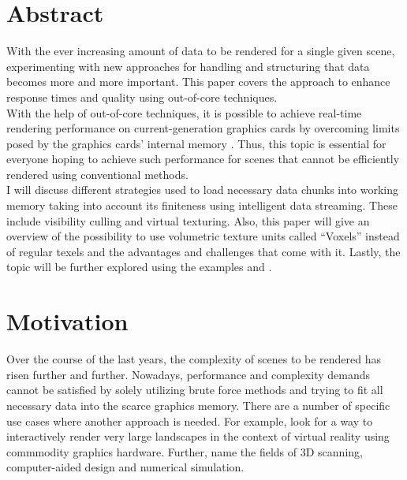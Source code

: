 \chapter{Abstract}
\label{ch:Abstract}

With the ever increasing amount of data to be rendered for a single given scene, experimenting with new approaches for handling and structuring that data becomes more and more important. This paper covers the approach to enhance response times and quality using out-of-core techniques. \\

With the help of out-of-core techniques, it is possible to achieve real-time rendering performance on current-generation graphics cards by overcoming limits posed by the graphics cards' internal memory \cite{Crassin:2009:GRS:1507149.1507152}. Thus, this topic is essential for everyone hoping to achieve such performance for scenes that cannot be efficiently rendered using conventional methods. \\

I will discuss different strategies used to load necessary data chunks into working memory taking into account its finiteness using intelligent data streaming. These include visibility culling and virtual texturing. Also, this paper will give an overview of the possibility to use volumetric texture units called ``Voxels'' instead of regular texels and the advantages and challenges that come with it. Lastly, the topic will be further explored using the examples \cite{Crassin:2009:GRS:1507149.1507152} and \cite{van2009id}.

\chapter{Motivation}
\label{ch:Motivation}

Over the course of the last years, the complexity of scenes to be rendered has risen further and further. Nowadays, performance and complexity demands cannot be satisfied by solely utilizing brute force methods and trying to fit all necessary data into the scarce graphics memory. There are a number of specific use cases where another approach is needed. For example, \cite{10.1007/978-3-540-40014-1_3} look for a way to interactively render very large landscapes in the context of virtual reality using commmodity graphics hardware. Further, \cite{Gobbetti:2005:FVM:1073204.1073277} name the fields of 3D scanning, computer-aided design and numerical simulation.


